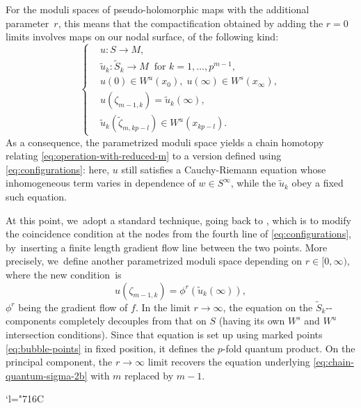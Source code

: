 \documentclass[10pt,a4paper]{amsart}
\providecommand{\nobreakdash}{\nobreak\hbox{-}}
\newcommand{\Changelback}{\mathcode`l="716C}
\theoremstyle{plain}
\theoremstyle{definition}
\begin{document}
For the moduli spaces of pseudo-holomorphic maps with the additional parameter~$r$, this means that the compactification obtained by adding the $r = 0$ limits involves maps on our nodal surface, of the following kind:
\begin{equation}\label{eq:configurations}
\left\{
\begin{aligned}
& u: S \to M, \\
& \tilde{u}_k: \tilde{S}_k \to M\;\; \text{for $k = 1,\dots,p^{m-1}$}, \\
& u(0) \in W^u(x_0), \; u(\infty) \in W^s(x_\infty), \\
& u(\zeta_{m-1,k}) = \tilde{u}_k(\infty), \\
& \tilde{u}_k(\tilde\zeta_{m,kp-l}) \in W^u(x_{kp-l}).
\end{aligned}
\right.
\end{equation}
As a consequence, the parametrized moduli space yields a chain homotopy relating \eqref{eq:operation-with-reduced-m} to a version defined using \eqref{eq:configurations}: here, $u$ still satisfies a Cauchy-Riemann equation whose inhomogeneous term varies in dependence of $w \in S^\infty$, while the $\tilde{u}_k$ obey a fixed such equation.

At this point, we~adopt a standard technique, going back to \cite{piunikhin-salamon-schwarz94}, which is to modify the coincidence condition at the nodes from the fourth line of \eqref{eq:configurations}, by~inserting a finite length gradient flow line between the two points. More precisely, we~define another parametrized moduli space depending on $r \in [0,\infty)$, where the new condition~is
\begin{equation}\label{eq:pss}
u(\zeta_{m-1,k}) = \phi^r(\tilde{u}_k(\infty)),
\end{equation}
$\phi^r$ being the gradient flow of $f$. In the limit $r \to \infty$, the equation on the $\tilde{S}_k$\nobreakdash-com\-po\-nents completely decouples from that on $S$ (having its own $W^s$ and $W^u$ intersection conditions). Since that equation is set up using marked points \eqref{eq:bubble-points} in fixed position, it defines the $p$-fold quantum product. On the principal component, the $r \to \infty$ limit recovers the equation underlying \eqref{eq:chain-quantum-sigma-2b} with $m$ replaced by $m-1$.

\Changelback
\end{document}
